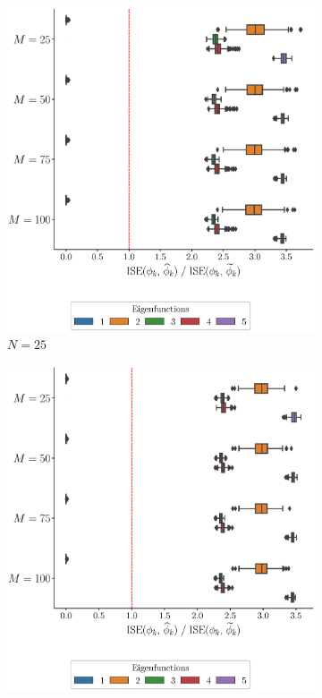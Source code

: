 \begin{results}
\begin{figure}
     \centering
     \begin{subfigure}[b]{0.49\textwidth}
         \centering
         \includegraphics[width=\textwidth]{figures/scenario_2/ise_N25.eps}
         \caption{$N = 25$}
         \label{fig:ise_mfd_2d_25}
     \end{subfigure}
     \hfill
     \begin{subfigure}[b]{0.49\textwidth}
         \centering
         \includegraphics[width=\textwidth]{figures/scenario_2/ise_N50.eps}

\end{subfigure}
\end{figure}
\end{results}
